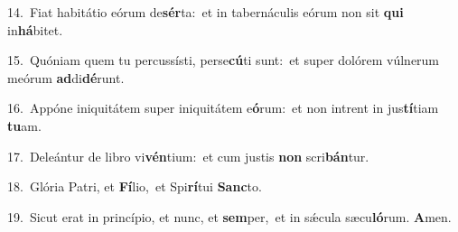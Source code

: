 {\numbfont\textcolor{\numbcolor}{14.}}~Fiat habitátio eórum de\-\textbf{sér}\-ta:~\star et in tabernáculis eórum non sit \textbf{qui} in\-\textbf{há}\-bitet.\par
{\numbfont\textcolor{\numbcolor}{15.}}~Quóniam quem tu percussísti, perse\-\textbf{cú}\-ti sunt:~\star et super dolórem vúlnerum meórum \textbf{ad}\-di\-\textbf{dé}\-runt.\par
{\numbfont\textcolor{\numbcolor}{16.}}~Appóne iniquitátem super iniquitátem e\-\textbf{ó}\-rum:~\star et non intrent in jus\-\textbf{tí}\-tiam \textbf{tu}\-am.\par
{\numbfont\textcolor{\numbcolor}{17.}}~Deleántur de libro vi\-\textbf{vén}\-tium:~\star et cum justis \textbf{non} scri\-\textbf{bán}\-tur.\par
{\numbfont\textcolor{\numbcolor}{18.}}~Glória Patri, et \textbf{Fí}\-lio,~\star et Spi\-\textbf{rí}\-tui \textbf{Sanc}\-to.\par
{\numbfont\textcolor{\numbcolor}{19.}}~Sicut erat in princípio, et nunc, et \textbf{sem}\-per,~\star et in sǽcula sæcu\-\textbf{ló}\-rum. \textbf{A}\-men.\par
